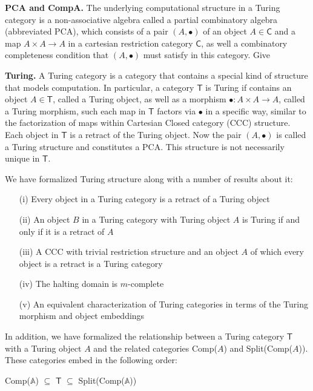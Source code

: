 \documentclass{entcs} \usepackage{entcsmacro}
\begin{document}
{\bfseries PCA and CompA.} The underlying computational structure in a Turing category is a non-associative algebra called a partial combinatory algebra (abbreviated PCA), which consists of a pair $(A, \bullet)$ of an object $A \in \mathsf{C}$ and a map $A \times A \to A$ in a cartesian restriction category $\mathsf{C}$, as well a combinatory completeness condition that $(A, \bullet)$ must satisfy in this category. Give

{\bfseries Turing.} A Turing category is a category that contains a special kind of structure that models computation. In particular, a category $\mathsf{T}$ is Turing if contains an object $A \in \mathsf{T}$, called a Turing object, as well as a morphism $\bullet : A \times A \to A$, called a Turing morphism, such each map in $\mathsf{T}$ factors via $\bullet$ in a specific way, similar to the factorization of maps within Cartesian Closed category (CCC) structure. Each object in $\mathsf{T}$ is a retract of the Turing object. Now the pair $(A, \bullet)$ is called a Turing structure and constitutes a PCA. This structure is not necessarily unique in $\mathsf{T}$.

We have formalized Turing structure along with a number of results about it:

\begin{itemize}
	\item[(i)] Every object in a Turing category is a retract of a Turing object~\cite{Turing}
	\item[(ii)] An object $B$ in a Turing category with Turing object $A$ is Turing if and only if it is a retract of $A$~\cite{Turing}
	
	\item[(iii)] A CCC with trivial restriction structure and an object $A$ of which every object is a retract is a Turing category
	\item[(iv)] The halting domain is $m$-complete~\cite{Turing}
	
	\item[(v)] An equivalent characterization of Turing categories in terms of the Turing morphism and object embeddings~\cite{Turing}
	
\end{itemize}

In addition, we have formalized the relationship between a Turing category $\mathsf{T}$ with a Turing object $A$ and the related categories Comp($A$) and Split(Comp($A$)). These categories embed in the following order:

\indent Comp($\mathbb{A}$) $\subseteq$ $\mathsf{T}$ $\subseteq$ Split(Comp($\mathbb{A}$))
\end{document}
